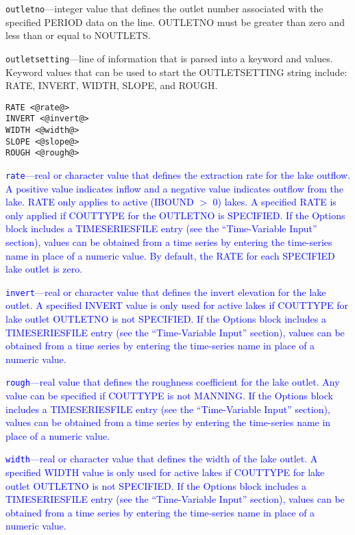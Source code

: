 \begin{description}
\item \texttt{outletno}---integer value that defines the outlet number associated with the specified PERIOD data on the line. OUTLETNO must be greater than zero and less than or equal to NOUTLETS.

\item \texttt{outletsetting}---line of information that is parsed into a keyword and values.  Keyword values that can be used to start the OUTLETSETTING string include: RATE, INVERT, WIDTH, SLOPE, and ROUGH.

\begin{lstlisting}[style=blockdefinition]
RATE <@rate@>
INVERT <@invert@>
WIDTH <@width@>
SLOPE <@slope@>
ROUGH <@rough@>
\end{lstlisting}

\item \textcolor{blue}{\texttt{rate}---real or character value that defines the extraction rate for the lake outflow. A positive value indicates inflow and a negative value indicates outflow from the lake. RATE only applies to active (IBOUND $>$ 0) lakes. A specified RATE is only applied if COUTTYPE for the OUTLETNO is SPECIFIED. If the Options block includes a TIMESERIESFILE entry (see the ``Time-Variable Input'' section), values can be obtained from a time series by entering the time-series name in place of a numeric value. By default, the RATE for each SPECIFIED lake outlet is zero.}

\item \textcolor{blue}{\texttt{invert}---real or character value that defines the invert elevation for the lake outlet. A specified INVERT value is only used for active lakes if COUTTYPE for lake outlet OUTLETNO is not SPECIFIED. If the Options block includes a TIMESERIESFILE entry (see the ``Time-Variable Input'' section), values can be obtained from a time series by entering the time-series name in place of a numeric value.}

\item \textcolor{blue}{\texttt{rough}---real value that defines the roughness coefficient for the lake outlet. Any value can be specified if COUTTYPE is not MANNING. If the Options block includes a TIMESERIESFILE entry (see the ``Time-Variable Input'' section), values can be obtained from a time series by entering the time-series name in place of a numeric value.}

\item \textcolor{blue}{\texttt{width}---real or character value that defines the width of the lake outlet. A specified WIDTH value is only used for active lakes if COUTTYPE for lake outlet OUTLETNO is not SPECIFIED. If the Options block includes a TIMESERIESFILE entry (see the ``Time-Variable Input'' section), values can be obtained from a time series by entering the time-series name in place of a numeric value.}


\end{description}
